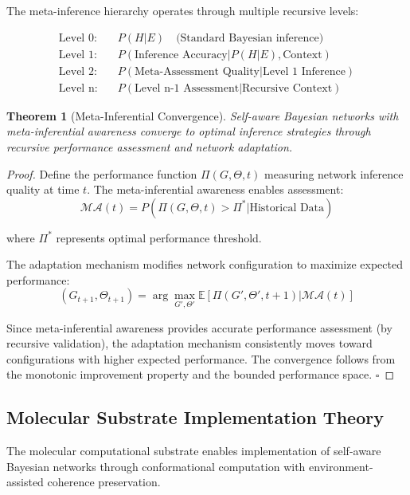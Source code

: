 \documentclass[12pt,a4paper]{article}
\newtheorem{theorem}{Theorem}[section]
\begin{document}
The meta-inference hierarchy operates through multiple recursive levels:

\begin{align}
\text{Level 0:} \quad &P(H | E) \quad \text{(Standard Bayesian inference)} \\
\text{Level 1:} \quad &P(\text{Inference Accuracy} | P(H | E), \text{Context}) \\
\text{Level 2:} \quad &P(\text{Meta-Assessment Quality} | \text{Level 1 Inference}) \\
\text{Level n:} \quad &P(\text{Level n-1 Assessment} | \text{Recursive Context})
\end{align}

\begin{theorem}[Meta-Inferential Convergence]
Self-aware Bayesian networks with meta-inferential awareness converge to optimal inference strategies through recursive performance assessment and network adaptation.
\end{theorem}

\begin{proof}
Define the performance function $\Pi(G, \Theta, t)$ measuring network inference quality at time $t$. The meta-inferential awareness enables assessment:
\begin{equation}
\mathcal{MA}(t) = P(\Pi(G, \Theta, t) > \Pi^* | \text{Historical Data})
\end{equation}

where $\Pi^*$ represents optimal performance threshold.

The adaptation mechanism modifies network configuration to maximize expected performance:
\begin{equation}
(G_{t+1}, \Theta_{t+1}) = \arg\max_{G', \Theta'} \mathbb{E}[\Pi(G', \Theta', t+1) | \mathcal{MA}(t)]
\end{equation}

Since meta-inferential awareness provides accurate performance assessment (by recursive validation), the adaptation mechanism consistently moves toward configurations with higher expected performance. The convergence follows from the monotonic improvement property and the bounded performance space. $\square$
\end{proof}

\subsection{Molecular Substrate Implementation Theory}

The molecular computational substrate enables implementation of self-aware Bayesian networks through conformational computation with environment-assisted coherence preservation.
\end{document}
